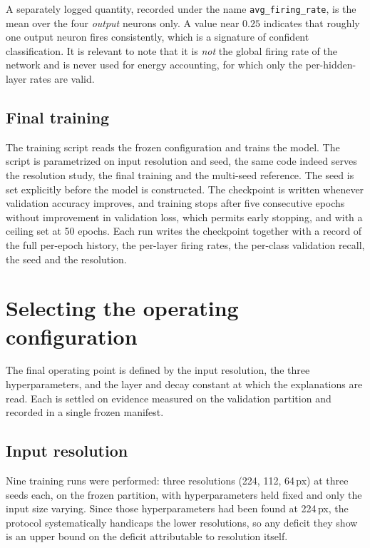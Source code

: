 A separately logged quantity, recorded under the name
\texttt{avg\_firing\_rate}, is the mean over the four \emph{output} neurons only.
A value near $0.25$ indicates that roughly one output neuron fires consistently,
which is a signature of confident classification.
It is relevant to note that it is \emph{not} the global firing rate of the network and is
never used for energy accounting, for which only the per-hidden-layer rates are
valid.
 
\subsection{Final training}
 
The training script reads the frozen configuration and trains the model. The script is
parametrized on input resolution and seed, the same code indeed serves the
resolution study, the final training and the multi-seed reference. The seed is
set explicitly before the model is constructed. The checkpoint is written
whenever validation accuracy improves, and training stops after five
consecutive epochs without improvement in validation loss, which permits early stopping,
and with a ceiling set at 50 epochs.
Each run writes the checkpoint together with a record of the full
per-epoch history, the per-layer firing rates, the per-class validation recall,
the seed and the resolution.
 
\section{Selecting the operating configuration}
\label{sec:operating-config}
 
The final operating point is defined by the input resolution, the three
hyperparameters, and the layer and decay constant at which the explanations
are read. Each is settled on evidence measured on the validation partition and
recorded in a single frozen manifest.
 
\subsection{Input resolution}
 
Nine training runs were performed: three resolutions (224, 112, 64\,px) at three
seeds each, on the frozen partition, with hyperparameters held fixed and only the
input size varying. Since those hyperparameters had been found at 224\,px, the
protocol systematically handicaps the lower resolutions, so any deficit they
show is an upper bound on the deficit attributable to resolution itself.
 
